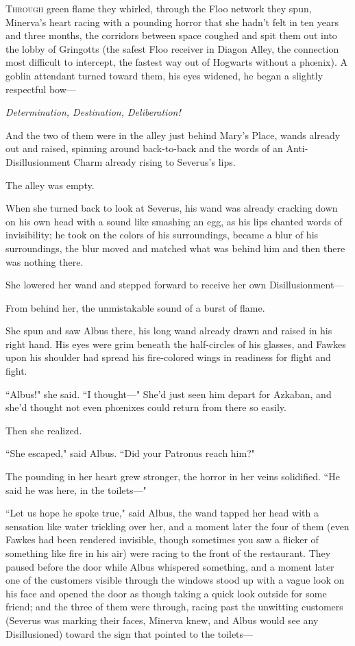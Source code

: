 
\lettrine{T}{hrough} green flame they whirled, through the Floo network they spun, Minerva's heart racing with a pounding horror that she hadn't felt in ten years and three months, the corridors between space coughed and spit them out into the lobby of Gringotts (the safest Floo receiver in Diagon Alley, the connection most difficult to intercept, the fastest way out of Hogwarts without a phœnix). A goblin attendant turned toward them, his eyes widened, he began a slightly respectful bow---

\emph{Determination, Destination, Deliberation!}

And the two of them were in the alley just behind Mary's Place, wands already out and raised, spinning around back-to-back and the words of an Anti-Disillusionment Charm already rising to Severus's lips.

The alley was empty.

When she turned back to look at Severus, his wand was already cracking down on his own head with a sound like smashing an egg, as his lips chanted words of invisibility; he took on the colors of his surroundings, became a blur of his surroundings, the blur moved and matched what was behind him and then there was nothing there.

She lowered her wand and stepped forward to receive her own Disillusionment---

From behind her, the unmistakable sound of a burst of flame.

She spun and saw Albus there, his long wand already drawn and raised in his right hand. His eyes were grim beneath the half-circles of his glasses, and Fawkes upon his shoulder had spread his fire-colored wings in readiness for flight and fight.

``Albus!" she said. ``I thought---" She'd just seen him depart for Azkaban, and she'd thought not even phœnixes could return from there so easily.

Then she realized.

``She escaped," said Albus. ``Did your Patronus reach him?"

The pounding in her heart grew stronger, the horror in her veins solidified. ``He said he was here, in the toilets---"

``Let us hope he spoke true," said Albus, the wand tapped her head with a sensation like water trickling over her, and a moment later the four of them (even Fawkes had been rendered invisible, though sometimes you saw a flicker of something like fire in his air) were racing to the front of the restaurant. They paused before the door while Albus whispered something, and a moment later one of the customers visible through the windows stood up with a vague look on his face and opened the door as though taking a quick look outside for some friend; and the three of them were through, racing past the unwitting customers (Severus was marking their faces, Minerva knew, and Albus would see any Disillusioned) toward the sign that pointed to the toilets---

